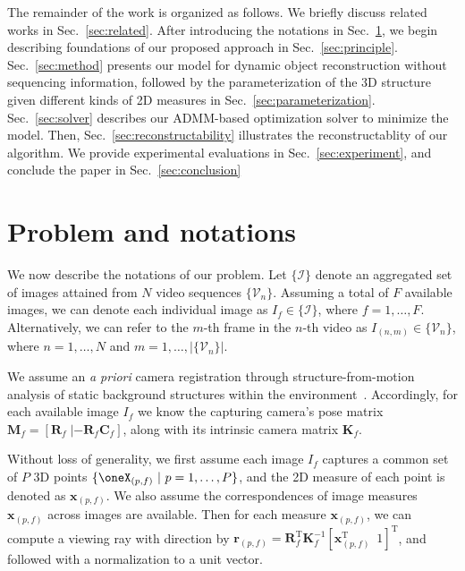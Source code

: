 The remainder of the work is organized as follows.
We briefly discuss related works in Sec.~\ref{sec:related}.
After introducing the notations in Sec.~\ref{sec:problem_and_notations}, we begin describing foundations of our proposed approach in Sec.~\ref{sec:principle}. Sec.~\ref{sec:method} presents our model for dynamic object reconstruction without sequencing information, followed by the parameterization of the 3D structure given different kinds of 2D measures in Sec.~\ref{sec:parameterization}.
Sec.~\ref{sec:solver} describes our ADMM-based optimization solver to minimize the model. Then, Sec.~\ref{sec:reconstructability} illustrates the reconstructablity of our algorithm. We provide experimental evaluations in Sec.~\ref{sec:experiment}, and conclude the paper in Sec.~\ref{sec:conclusion}


\section{Problem and notations} \label{sec:problem_and_notations}

We now describe the notations of our problem.
Let $\{\mathcal I\}$ denote an aggregated set of images attained from $N$ video sequences $\{\mathcal V_n \}$.
Assuming a total of $F$ available images, we can denote each individual image as $I_f \in \{\mathcal I\} $, where  $f=1,\dots,F$.
Alternatively, we can refer to  the $m$-th frame in the $n$-th video as $I_{(n,m)} \in\{\mathcal V_n \}$, where $n=1,\dots,N$ and $m=1,\dots, \left\vert{\{\mathcal V_n \}}\right\vert$.

We assume an {\em a priori} camera registration  through structure-from-motion analysis of  static background structures within the environment~\cite{WuVSFM}.
Accordingly, for each available image  $I_f$ we know the capturing camera's pose matrix
$\mathbf M_f=\left[  \mathbf{R}_f  \; |-\mathbf{R}_f \mathbf{C}_f\right]$,
along with its intrinsic camera matrix $\mathbf K_f$.

Without loss of generality, we first assume each image $I_f$ captures a common set of $P$ 3D points $\{\oneX_{(p,f)}~|~p=1,\dots,P\}$, and the 2D measure of each point is denoted as $\mathbf{x}_{(p,f)}$.
We also assume the correspondences of image measures $\mathbf{x}_{(p,f)}$ across images are available. 
Then for each measure $\mathbf x_{(p,f)}$, %
we can compute a viewing ray with direction by 
$ \mathbf{r}_{(p,f)}=\mathbf{R}_f^{\text{T}} \mathbf{K}^{-1}_f 
 [\mathbf{x}_{(p,f)}^{\text{T}}  \enspace 1]^\text{T}$, and followed with a normalization to a unit vector.

